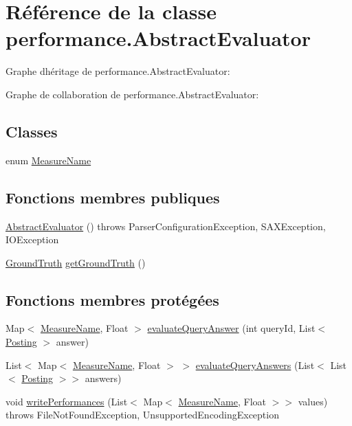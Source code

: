 \hypertarget{classperformance_1_1AbstractEvaluator}{}\section{Référence de la classe performance.\+Abstract\+Evaluator}
\label{classperformance_1_1AbstractEvaluator}


Graphe d\textquotesingle{}héritage de performance.\+Abstract\+Evaluator\+:


Graphe de collaboration de performance.\+Abstract\+Evaluator\+:
\subsection*{Classes}
\begin{DoxyCompactItemize}
\item 
enum \hyperlink{enumperformance_1_1AbstractEvaluator_1_1MeasureName}{Measure\+Name}
\end{DoxyCompactItemize}
\subsection*{Fonctions membres publiques}
\begin{DoxyCompactItemize}
\item 
\hyperlink{classperformance_1_1AbstractEvaluator_a2a0f90a0b3c8e8306b2d95086bf7a042}{Abstract\+Evaluator} ()  throws Parser\+Configuration\+Exception, S\+A\+X\+Exception, I\+O\+Exception 	
\item 
\hyperlink{classperformance_1_1GroundTruth}{Ground\+Truth} \hyperlink{classperformance_1_1AbstractEvaluator_a6812123cd08723f55af47ece00f5354d}{get\+Ground\+Truth} ()
\end{DoxyCompactItemize}
\subsection*{Fonctions membres protégées}
\begin{DoxyCompactItemize}
\item 
Map$<$ \hyperlink{enumperformance_1_1AbstractEvaluator_1_1MeasureName}{Measure\+Name}, Float $>$ \hyperlink{classperformance_1_1AbstractEvaluator_a7f6fd1bcf738d91e0a1e5fc0f24d84f2}{evaluate\+Query\+Answer} (int query\+Id, List$<$ \hyperlink{classindexation_1_1content_1_1Posting}{Posting} $>$ answer)
\item 
List$<$ Map$<$ \hyperlink{enumperformance_1_1AbstractEvaluator_1_1MeasureName}{Measure\+Name}, Float $>$ $>$ \hyperlink{classperformance_1_1AbstractEvaluator_a289fd837249498b0d1016777189c98cc}{evaluate\+Query\+Answers} (List$<$ List$<$ \hyperlink{classindexation_1_1content_1_1Posting}{Posting} $>$$>$ answers)
\item 
void \hyperlink{classperformance_1_1AbstractEvaluator_ace1f5ce554bea51a7fccc5308ac41ac9}{write\+Performances} (List$<$ Map$<$ \hyperlink{enumperformance_1_1AbstractEvaluator_1_1MeasureName}{Measure\+Name}, Float $>$$>$ values)  throws File\+Not\+Found\+Exception, Unsupported\+Encoding\+Exception 	
\end{DoxyCompactItemize}
